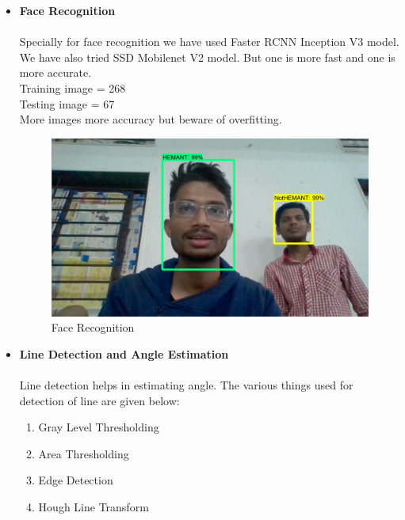 \begin{itemize}[wide, labelwidth=!, labelindent=0pt]
    \item \textbf{Face Recognition}
    \vspace{-0.5cm} 
    \paragraph{} Specially for face recognition we have used Faster RCNN Inception V3 model. We have also tried SSD Mobilenet V2 model. But one is more fast and one is more accurate.\\
    Training image = 268\\
    Testing image = 67\\
    More images more accuracy but beware of overfitting.
    
    \begin{figure}[H]
    \centering
    \includegraphics[width = 13cm]{project/images/face_detection.png}
    \caption{Face Recognition}
    \end{figure}

    \item \textbf{Line Detection and Angle Estimation}
    \vspace{-0.5cm}
    \paragraph{} Line detection helps in estimating angle. The various things used for detection of line are given below:
    
    \begin{enumerate}
        \item Gray Level Thresholding
        \item Area Thresholding
        \item Edge Detection
        \item Hough Line Transform
    \end{enumerate}
    

\end{itemize}
